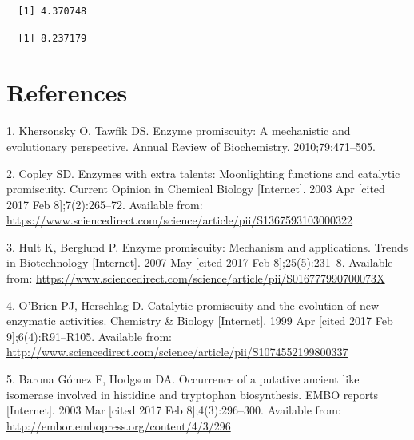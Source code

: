 \documentclass[12pt,twoside]{reedthesis}
\begin{document}
  \begin{verbatim}
  [1] 4.370748
  \end{verbatim}
  
  \begin{Shaded}
  \begin{Highlighting}[]
  \NormalTok{(}
  \end{Highlighting}
  \end{Shaded}
  
  \begin{verbatim}
  [1] 8.237179
  \end{verbatim}
  
  \backmatter
  
  \chapter{References}\label{references}
  
  \noindent
  
  \setlength{\parindent}{-0.20in} \setlength{\leftskip}{0.20in}
  \setlength{\parskip}{8pt}
  
  \hypertarget{refs}{}
  \hypertarget{ref-khersonsky_enzyme_2010}{}
  1. Khersonsky O, Tawfik DS. Enzyme promiscuity: A mechanistic and
  evolutionary perspective. Annual Review of Biochemistry.
  2010;79:471--505.
  
  \hypertarget{ref-copley_enzymes_2003}{}
  2. Copley SD. Enzymes with extra talents: Moonlighting functions and
  catalytic promiscuity. Current Opinion in Chemical Biology
  {[}Internet{]}. 2003 Apr {[}cited 2017 Feb 8{]};7(2):265--72. Available
  from:
  \url{https://www.sciencedirect.com/science/article/pii/S1367593103000322}
  
  \hypertarget{ref-hult_enzyme_2007}{}
  3. Hult K, Berglund P. Enzyme promiscuity: Mechanism and applications.
  Trends in Biotechnology {[}Internet{]}. 2007 May {[}cited 2017 Feb
  8{]};25(5):231--8. Available from:
  \url{https://www.sciencedirect.com/science/article/pii/S016777990700073X}
  
  \hypertarget{ref-obrien_catalytic_1999}{}
  4. O'Brien PJ, Herschlag D. Catalytic promiscuity and the evolution of
  new enzymatic activities. Chemistry \& Biology {[}Internet{]}. 1999 Apr
  {[}cited 2017 Feb 9{]};6(4):R91--R105. Available from:
  \url{http://www.sciencedirect.com/science/article/pii/S1074552199800337}
  
  \hypertarget{ref-baronagomez_occurrence_2003}{}
  5. Barona Gómez F, Hodgson DA. Occurrence of a putative ancient like
  isomerase involved in histidine and tryptophan biosynthesis. EMBO
  reports {[}Internet{]}. 2003 Mar {[}cited 2017 Feb 8{]};4(3):296--300.
  Available from: \url{http://embor.embopress.org/content/4/3/296}
  
\end{document}
